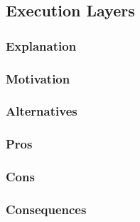 \subsection{Execution Layers}
\label{subsec:detailed_execution_layers}
\subsubsection{Explanation}

\subsubsection{Motivation}

\subsubsection{Alternatives}

\subsubsection{Pros}

\subsubsection{Cons}

\subsubsection{Consequences}
